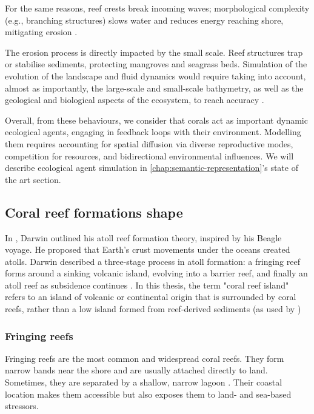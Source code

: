 For the same reasons, reef crests break incoming waves; morphological complexity (e.g., branching structures) slows water and reduces energy reaching shore, mitigating erosion \cite{Woodroffe2003}.

The erosion process is directly impacted by the small scale. Reef structures trap or stabilise sediments, protecting mangroves and seagrass beds. Simulation of the evolution of the landscape and fluid dynamics would require taking into account, almost as importantly, the large-scale and small-scale bathymetry, as well as the geological and biological aspects of the ecosystem, to reach accuracy \cite{Chevalier2017,Chevalier2015a}.


Overall, from these behaviours, we consider that corals act as important dynamic ecological agents, engaging in feedback loops with their environment. Modelling them requires accounting for spatial diffusion via diverse reproductive modes, competition for resources, and bidirectional environmental influences. We will describe ecological agent simulation in \cref{chap:semantic-representation}'s state of the art section. %


\subsection{Coral reef formations shape}
In \cite{Darwin1842}, Darwin outlined his atoll reef formation theory, inspired by his Beagle voyage. He proposed that Earth's crust movements under the oceans created atolls. Darwin described a three-stage process in atoll formation: a fringing reef forms around a sinking volcanic island, evolving into a barrier reef, and finally an atoll reef as subsidence continues \cite{Hopley2014}. In this thesis, the term "coral reef island" refers to an island of volcanic or continental origin that is surrounded by coral reefs, rather than a low island formed from reef-derived sediments (as used by \cite{Masselink2020})

\subsubsection{Fringing reefs}
Fringing reefs are the most common and widespread coral reefs. They form narrow bands near the shore and are usually attached directly to land. Sometimes, they are separated by a shallow, narrow lagoon \cite{Kovacs2020}. Their coastal location makes them accessible but also exposes them to land- and sea-based stressors.

